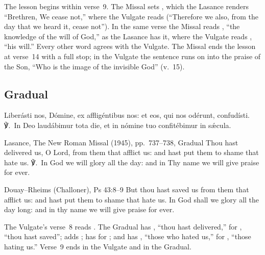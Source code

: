 \noindent The lesson begins within verse~9. The Missal sets , which the Lasance renders ``Brethren, We cease not,'' where the
Vulgate reads 
(``Therefore we also, from the day that we heard it, cease not''). In the same
verse the Missal reads , ``the knowledge of
the will of God,'' as the Lasance has it, where the Vulgate reads
, ``his will.'' Every other word agrees with the
Vulgate. The Missal ends the lesson at verse~14 with a full stop; in the
Vulgate the sentence runs on into the praise of the Son, ``Who is the image of
the invisible God'' (v.~15).

\subsection{Gradual}
\label{proper-gradual}


\begin{latinproper}
Liberásti nos, Dómine, ex affligéntibus nos: et eos, qui nos odérunt,
confudísti. ℣.~In Deo laudábimur tota die, et in nómine tuo confitébimur in
sǽcula.
\end{latinproper}

\begin{englishwitness}{Lasance, The New Roman Missal (1945), pp.~737--738, Gradual}
Thou hast delivered us, O Lord, from them that afflict us: and hast put them
to shame that hate us. ℣.~In God we will glory all the day: and in Thy name we
will give praise for ever.
\end{englishwitness}

\begin{englishwitness}{Douay--Rheims (Challoner), Ps 43:8--9}
But thou hast saved us from them that afflict us: and hast put them to shame
that hate us. In God shall we glory all the day long: and in thy name we will
give praise for ever.
\end{englishwitness}

\noindent The Vulgate's verse~8 reads . The Gradual has ,
``thou hast delivered,'' for , ``thou hast saved''; adds
; has  for ; and has , ``those who hated us,'' for , ``those hating
us.'' Verse~9 ends  in the Vulgate and 
in the Gradual.

